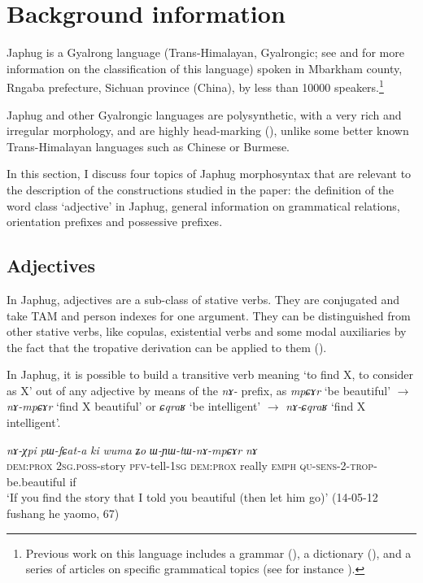 \documentclass[oneside,a4paper,12pt]{article}
\newcommand{\ipa}[1]{{\phon\textit{#1}}}
\begin{document}
\section{Background information} \label{sec:background}
Japhug is a Gyalrong language (Trans-Himalayan, Gyalrongic; see \citealt{jackson00sidaba} and \citealt{jacques.michaud11naish} for more information on the classification of this language) spoken in Mbarkham county, Rngaba prefecture, Sichuan province (China), by less than 10000 speakers.\footnote{Previous work on this language includes a grammar (\citealt{jacques08}), a dictionary (\citealt{jacques15japhug}), and a series of articles on specific grammatical topics (see for instance \citealt{jacques13harmonization, jacques14linking, jacques16relatives}). } 


Japhug and other Gyalrongic languages are polysynthetic, with a very rich and irregular morphology, and are highly head-marking (\citealt{jacques13harmonization, jackson14morpho}), unlike some better known Trans-Himalayan languages such as Chinese or Burmese.

In this section, I discuss four topics of Japhug morphosyntax that are relevant to the description of the constructions studied in the paper: the definition of the word class `adjective' in Japhug, general information on grammatical relations, orientation prefixes and possessive prefixes.


\subsection{Adjectives}
In Japhug, adjectives are a sub-class of stative verbs. They are conjugated and take TAM and person indexes for one argument. They can be distinguished from other stative verbs, like copulas, existential verbs and some modal auxiliaries by the fact that the tropative derivation can be applied to them (\citealt{jacques13tropative}).

In Japhug, it is possible to build a transitive verb meaning `to find X, to consider as X' out of any adjective by means of the \ipa{nɤ-} prefix, as  \ipa{mpɕɤr} `be beautiful' $\rightarrow$ \ipa{nɤ-mpɕɤr} `find X beautiful' or \ipa{ɕqraʁ} `be intelligent' $\rightarrow$ \ipa{nɤ-ɕqraʁ} `find X intelligent'.

\begin{exe}
\ex \label{ex:WYWtWnAmpCAr}
\gll \ipa{kɯki}	\ipa{nɤ-χpi}	\ipa{pɯ-fɕat-a}	\ipa{ki}	\ipa{wuma}	\ipa{ʑo}	\ipa{ɯ-ɲɯ-tɯ-nɤ-mpɕɤr}	\ipa{nɤ} \\
\textsc{dem:prox} \textsc{2sg.poss}-story \textsc{pfv}-tell-\textsc{1sg} \textsc{dem:prox}  really \textsc{emph} \textsc{qu-sens}-2-\textsc{trop}-be.beautiful if \\
\glt `If you find the story that I told you beautiful (then let him go)' (14-05-12 fushang he yaomo, 67)
\end{exe}
\end{document}
